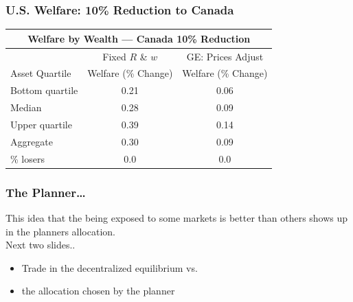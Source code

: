\documentclass[9pt,pdftex,aspectratio=1610]{beamer}
\theoremstyle{definition}
\begin{document}
\begin{frame}[t]
\frametitle{U.S. Welfare: 10\% Reduction to Canada}
\begin{table}[!t]
\footnotesize
\setlength {\tabcolsep}{6.05mm}
\renewcommand{\arraystretch}{1.80}
\begin{center}
\begin{tabular}{l c c}
\multicolumn{3}{c}{\small \textbf{Welfare by Wealth --- Canada {\color{red} 10\%} Reduction}}\\
\hline
\hline
& \footnotesize  Fixed $R$ \& $w$ & GE: Prices Adjust \\
\cmidrule(lr){2-2}  \cmidrule(lr){3-3}
\footnotesize  Asset Quartile & \footnotesize  Welfare (\% Change) & \footnotesize  Welfare (\% Change) \\
\footnotesize  Bottom quartile  & 0.21 & 0.06 \\
\footnotesize  Median & 0.28 & 0.09 \\
\footnotesize  Upper quartile  & 0.39 & 0.14  \\
\footnotesize  Aggregate & 0.30 &  0.09 \\
\cmidrule(lr){2-2}  \cmidrule(lr){3-3}
\footnotesize  \% losers & 0.0 & 0.0\\
\hline
\end{tabular}
\end{center}
\end{table}
\end{frame}



\begin{frame}[t]
\frametitle{The Planner\ldots}
\smallskip
This idea that the being exposed to some markets is better than others shows up in the planners allocation.\\
\bigskip
Next two slides..
\begin{itemize}
\item Trade in the decentralized equilibrium vs.
\medskip
\item the allocation chosen by the planner
\end{itemize}
\end{frame}


\end{document}
